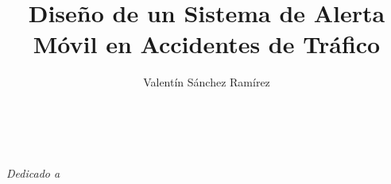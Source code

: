 \documentclass[12pt,a4paper]{report}
\author{Valentín Sánchez Ramírez}
\title{Diseño de un Sistema de Alerta Móvil en Accidentes de Tr\'afico}
\begin{document}
	
	
	
	
	\newpage
	$\ $
	\thispagestyle{empty} 
	
	\chapter*{}
	
		\textit{Dedicado a	}
	
	
		
	
	
	
	
	
	
	
	
	
	
	
	
	
	
	
	
	
	
	
	
	
	
	
\end{document}
